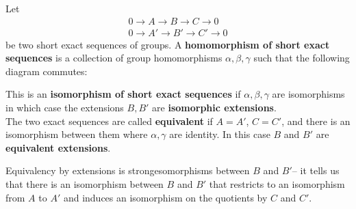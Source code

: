 \documentclass{memoir}
\begin{document}
\begin{defn}
	Let
	\begin{align*}
		0 \to A \to B \to C \to 0\\
		0 \to A' \to B' \to C' \to 0
	\end{align*}
	be two short exact sequences of groups. A \textbf{homomorphism of short exact sequences} is a collection of group homomorphisms \(\alpha ,\beta ,\gamma \) such that the following diagram commutes:
\begin{center}
\end{center}
This is an \textbf{isomorphism of short exact sequences} if \(\alpha ,\beta ,\gamma \) are isomorphisms in which case the extensions \(B,B'\) are \textbf{isomorphic extensions}.\\

The two exact sequences are called \textbf{equivalent} if \(A = A'\), \(C = C'\), and there is an isomorphism between them where  \(\alpha ,\gamma \) are identity. In this case \(B\) and \(B'\) are \textbf{equivalent extensions}.
\end{defn}
Equivalency by extensions is strongesomorphisms between \(B\) and \(B'\)-- it tells us that there is an isomorphism between \(B\) and \(B'\) that restricts to an isomorphism from \(A\) to \(A'\) and induces an isomorphism on the quotients by \(C\) and \(C'\).

\begin{exmp}
	
\end{exmp}
\end{document}
